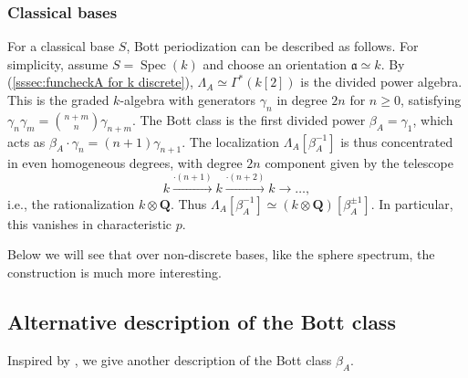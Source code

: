 \documentclass[12pt, oneside]{amsart}
\numberwithin{equation}{section}
\theoremstyle{remark}
\theoremstyle{plain}
\renewcommand{\ge}{\geqslant}
\newcommand{\fra}{\mathfrak{a}}
\newcommand{\lam}{\Lambda}
\DeclareMathOperator{\spc}{Spec}
\newcommand{\bQ}{\mathbf{Q}}
\begin{document}
\subsubsection{Classical bases}\label{sssec:Bott classical}

For a classical base $S$, Bott periodization can be described as follows.
For simplicity, assume $S = \spc(k)$ and choose an orientation $\fra \simeq k$.
By (\ref{sssec:funcheckA for k discrete}), $\lam_A \simeq \Gamma^*(k[2])$ is the divided power algebra.
This is the graded $k$-algebra with generators $\gamma_n$ in degree $2n$ for $n \ge 0$, satisfying $\gamma_n \gamma_m = \binom{n+m}{n} \gamma_{n+m}$.
The Bott class is the first divided power $\beta_A = \gamma_1$, which acts as $\beta_A \cdot \gamma_n = (n+1) \gamma_{n+1}$.
The localization $\lam_A[\beta_A^{-1}]$ is thus concentrated in even homogeneous degrees, with degree $2n$ component given by the telescope
\[
  k \xrightarrow{\cdot (n+1)} k \xrightarrow{\cdot (n+2)} k \to \dots,
\]
i.e., the rationalization $k \otimes \bQ$.
Thus $\lam_A[\beta_A^{-1}] \simeq (k \otimes \bQ)[\beta_A^{\pm 1}]$.
In particular, this vanishes in characteristic $p$.

Below we will see that over non-discrete bases, like the sphere spectrum, the construction is much more interesting.

\subsection{Alternative description of the Bott class}

Inspired by \cite[\S 4.3]{LurieEll2}, we give another description of the Bott class $\beta_A$.

\subsubsection{}\label{sssec:linearization map}
\end{document}
